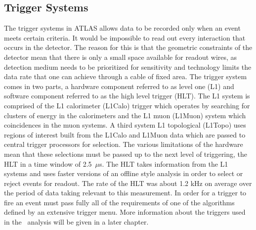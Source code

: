 \subsection{Trigger Systems}%
\label{sec:trigger}

The trigger systems in ATLAS allows data to be recorded only when an event meets
certain criteria. It would be impossible to read out every interaction that
occurs in the detector. The reason for this is that the geometric constraints of
the detector mean that there is only a small space available for readout wires,
as detection medium needs to be prioritized for sensitivity and technology
limits the data rate that one can achieve through a cable of fixed area. The
trigger system comes in two parts, a hardware component referred to as level one
(L1) and software component referred to as the high level trigger (HLT). The L1
system is comprised of the L1 calorimeter (L1Calo) trigger which operates by
searching for clusters of energy in the calorimeters and the L1 muon (L1Muon)
system which coincidences in the muon systems. A third system L1 topological
(L1Topo) uses regions of interest built from the L1Calo and L1Muon data which
are passed to central trigger processors for selection. The various limitations
of the hardware mean that these selections must be passed up to the next level
of triggering, the HLT in a time window of 2.5~$\mu$s. The HLT takes information
from the L1 systems and uses faster versions of an offline style analysis in
order to select or reject events for readout. The rate of the HLT was about 1.2
kHz on average over the period of data taking relevant to this measurement. In
order for a trigger to fire an event must pass fully all of the requirements of
one of the algorithms defined by an extensive trigger menu. More information
about the triggers used in the \VHbb\ analysis will be given in a later chapter.
